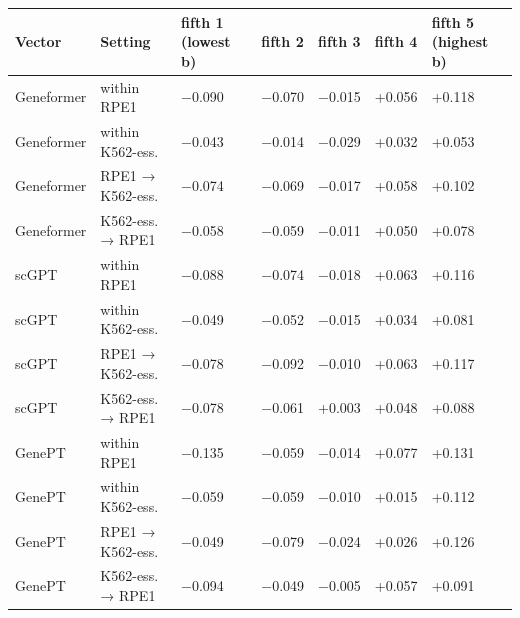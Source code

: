 \begin{tabular}{lllllll}
\toprule
Vector & Setting & fifth 1 (lowest b) & fifth 2 & fifth 3 & fifth 4 & fifth 5 (highest b) \\
\midrule
Geneformer & within RPE1 & −0.090 & −0.070 & −0.015 & +0.056 & +0.118 \\
Geneformer & within K562-ess. & −0.043 & −0.014 & −0.029 & +0.032 & +0.053 \\
Geneformer & RPE1 → K562-ess. & −0.074 & −0.069 & −0.017 & +0.058 & +0.102 \\
Geneformer & K562-ess. → RPE1 & −0.058 & −0.059 & −0.011 & +0.050 & +0.078 \\
scGPT & within RPE1 & −0.088 & −0.074 & −0.018 & +0.063 & +0.116 \\
scGPT & within K562-ess. & −0.049 & −0.052 & −0.015 & +0.034 & +0.081 \\
scGPT & RPE1 → K562-ess. & −0.078 & −0.092 & −0.010 & +0.063 & +0.117 \\
scGPT & K562-ess. → RPE1 & −0.078 & −0.061 & +0.003 & +0.048 & +0.088 \\
GenePT & within RPE1 & −0.135 & −0.059 & −0.014 & +0.077 & +0.131 \\
GenePT & within K562-ess. & −0.059 & −0.059 & −0.010 & +0.015 & +0.112 \\
GenePT & RPE1 → K562-ess. & −0.049 & −0.079 & −0.024 & +0.026 & +0.126 \\
GenePT & K562-ess. → RPE1 & −0.094 & −0.049 & −0.005 & +0.057 & +0.091 \\
\bottomrule
\end{tabular}
